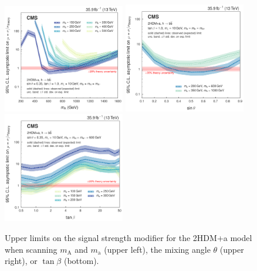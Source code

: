 \begin{figure}[htbp]
  \centering
  \includegraphics[width=0.475\textwidth]{figures/limits/limits_2hdma_mass.pdf}
  \includegraphics[width=0.475\textwidth]{figures/limits/limits_2hdma_sinp.pdf}\\
  \includegraphics[width=0.475\textwidth]{figures/limits/limits_2hdma_tanb.pdf}\\
  \caption{Upper limits on the signal strength modifier for the 2HDM+a model when scanning $m_\text{A}$ and $m_\text{a}$ (upper left), the mixing angle $\theta$ (upper right), or $\tan\beta$ (bottom).}
  \label{fig:limits_2hdma}
\end{figure}


